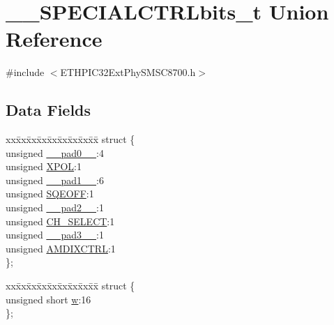 \hypertarget{union_____s_p_e_c_i_a_l_c_t_r_lbits__t}{}\section{\+\_\+\+\_\+\+S\+P\+E\+C\+I\+A\+L\+C\+T\+R\+Lbits\+\_\+t Union Reference}
\label{union_____s_p_e_c_i_a_l_c_t_r_lbits__t}


{\ttfamily \#include $<$E\+T\+H\+P\+I\+C32\+Ext\+Phy\+S\+M\+S\+C8700.\+h$>$}

\subsection*{Data Fields}
\begin{DoxyCompactItemize}
\item 
\begin{tabbing}
xx\=xx\=xx\=xx\=xx\=xx\=xx\=xx\=xx\=\kill
struct \{\\
\>unsigned \hyperlink{union_____s_p_e_c_i_a_l_c_t_r_lbits__t_adf71f3d8410c1f1dbbc96680a92c49af}{\_\_pad0\_\_}:4\\
\>unsigned \hyperlink{union_____s_p_e_c_i_a_l_c_t_r_lbits__t_a95295a55abaebd3cb654ddc970a85c7a}{XPOL}:1\\
\>unsigned \hyperlink{union_____s_p_e_c_i_a_l_c_t_r_lbits__t_acaf2d0924a107ec6e8d2e31febaf66f9}{\_\_pad1\_\_}:6\\
\>unsigned \hyperlink{union_____s_p_e_c_i_a_l_c_t_r_lbits__t_a70e5068f5e13d7d36031ba6b02a79552}{SQEOFF}:1\\
\>unsigned \hyperlink{union_____s_p_e_c_i_a_l_c_t_r_lbits__t_a4d97cc5f7d51d22fc2bf3eab35c9cb7f}{\_\_pad2\_\_}:1\\
\>unsigned \hyperlink{union_____s_p_e_c_i_a_l_c_t_r_lbits__t_a240937d212a5abcad1c8f2bce615a143}{CH\_SELECT}:1\\
\>unsigned \hyperlink{union_____s_p_e_c_i_a_l_c_t_r_lbits__t_ad7d7cee33e0c7f447abc4d171c628dd4}{\_\_pad3\_\_}:1\\
\>unsigned \hyperlink{union_____s_p_e_c_i_a_l_c_t_r_lbits__t_aa074bf8630cee4a7c8ebb420b5350f1b}{AMDIXCTRL}:1\\
\}; \\

\end{tabbing}\item 
\begin{tabbing}
xx\=xx\=xx\=xx\=xx\=xx\=xx\=xx\=xx\=\kill
struct \{\\
\>unsigned short \hyperlink{union_____s_p_e_c_i_a_l_c_t_r_lbits__t_a160850a4684a3e82c2323033964f2e98}{w}:16\\
\}; \\


\end{tabbing}
\end{DoxyCompactItemize}
